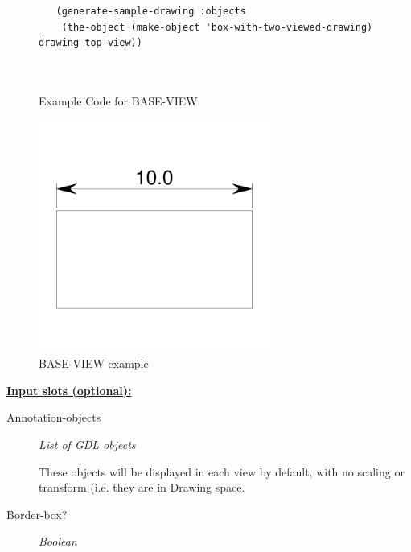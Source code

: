 \documentclass [11pt]{book}
\begin{document}
\begin{itemize}
\begin{figure}
\begin{lrbox}{\boxedverb}
\begin{minipage}{\linewidth}
{\begin{verbatim}
   (generate-sample-drawing :objects 
    (the-object (make-object 'box-with-two-viewed-drawing) drawing top-view))
 
 
\end{verbatim}}
\end{minipage}
\end{lrbox}
\fbox{\usebox{\boxedverb}}

\caption{Example Code for BASE-VIEW}

\label{fig:example-code-BASE-VIEW}

\end{figure}

\begin{figure}
\begin{center}
\includegraphics[width=3in,height=3in]{../images/example-BASE-VIEW.pdf}
\end{center}

\caption{BASE-VIEW example}

\label{fig:BASE-VIEW}

\end{figure}





\textbf{
\underline{Input slots (optional):}}

\begin{description}

\item [Annotation-objects]
\emph{List of GDL objects}

 These objects will be displayed in each view by default, with no scaling or transform (i.e. they are in Drawing space.




\item [Border-box?]
\emph{Boolean}


\end{description}
\end{itemize}
\end{document}

